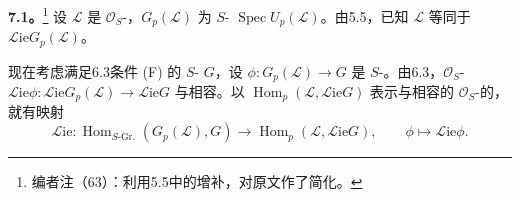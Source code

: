 \textbf{7.1。}\footnote{编者注（63）：利用5.5中的增补，对原文作了简化。}
设 $\mathcal L$ 是 $\mathcal O_S$-，$G_p(\mathcal L)$ 为 $S$- $\operatorname{Spec}U_p(\mathcal L)$。由5.5，已知 $\mathcal L$ 等同于 $\mathscr{L}\mathrm{ie}G_p(\mathcal L)$。

现在考虑满足6.3条件 (F) 的 $S$- $G$，设 $\phi:G_p(\mathcal L)\to G$ 是 $S$-。由6.3，$\mathcal O_S$- $\mathscr{L}\mathrm{ie}\phi:\mathscr{L}\mathrm{ie}G_p(\mathcal L)\to\mathscr{L}\mathrm{ie}G$ 与相容。以 $\operatorname{Hom}_p(\mathcal L,\mathscr{L}\mathrm{ie}G)$ 表示与相容的 $\mathcal O_S$-的，就有映射
\[
 \mathscr{L}\mathrm{ie}:\operatorname{Hom}_{S\text{-Gr.}}(G_p(\mathcal L),G)
 \longrightarrow\operatorname{Hom}_p(\mathcal L,\mathscr{L}\mathrm{ie}G),\qquad
 \phi\longmapsto\mathscr{L}\mathrm{ie}\phi.
\]

